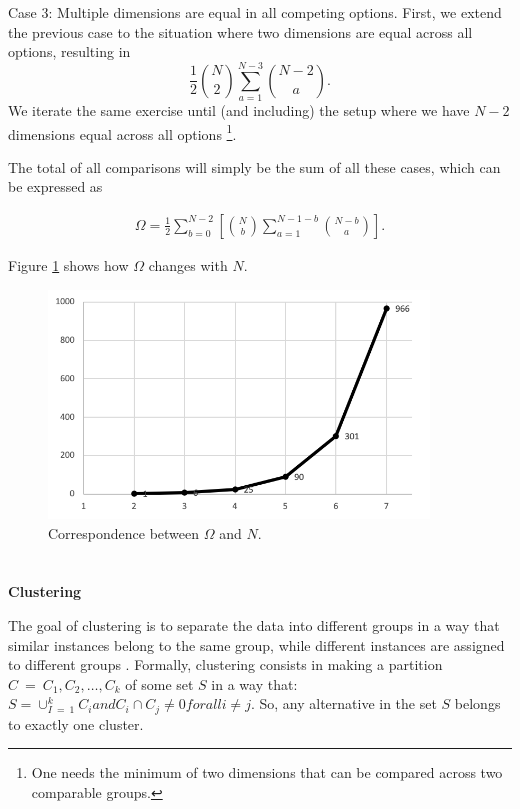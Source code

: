 \documentclass[a4paper,12pt]{article}
\begin{document}
Case 3: Multiple dimensions are equal in all competing options. First, we extend the previous case to the situation where two dimensions are equal across all options, resulting in $$\frac{1}{2}\binom{N}{2}\sum_{a=1}^{N-3}{\binom{N-2}{a}}.$$ We iterate the same exercise until (and including) the setup where we have $N-2$ dimensions equal across all options \footnote{One needs the minimum of two dimensions that can be compared across two comparable groups.}. 

The total of all comparisons will simply be the sum of all these cases, which can be expressed as

\begin{align}\label{eq:compromiseEffectDetailedCalculation}
    \Omega=\frac{1}{2}\sum_{b=0}^{N-2}\left[\binom{N}{b}\sum_{a=1}^{N-1-b}\binom{N-b}{a}\right].    
\end{align}


Figure \ref{fig:compromiseComparisonPlot} shows how $\Omega$ changes with $N$.

\begin{figure}[H]
    \centering
    \includegraphics[width=0.9\textwidth]{staticFiles/compromiseComparisonsZakAppendix.png}
    \caption{Correspondence between $\Omega$ and $N$.}
    \label{fig:compromiseComparisonPlot}
\end{figure}


\newpage
\section{}\label{appendix:clusteringAlgorithms}

\textbf{Clustering}

The goal of clustering is to separate the data into different groups in a way that similar instances belong to the same group, while different instances are assigned to different groups \citep{maimon2005data}. Formally, clustering consists in making a partition $C\ =\ {C_1,C_2,\ldots,C_k}$ of some set $S$ in a way that: $S=\cup_{I\ =\ 1}^kC_i and C_i\cap C_j\neq0 for all i\neq j$. So, any alternative in the set $S$ belongs to exactly one cluster.
\end{document}
